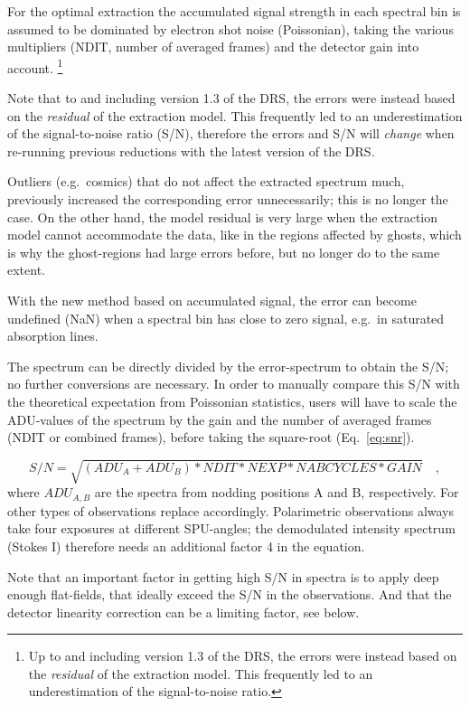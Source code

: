 For the optimal extraction
the accumulated signal strength in each spectral bin is assumed to be dominated
by electron shot noise (Poissonian), taking the various multipliers (NDIT,
number of averaged frames) and the detector gain into account.
\footnote{Up to and including version 1.3 of the DRS, the errors were instead
 based on the \emph{residual} of the extraction model. This frequently led to
 an underestimation of the signal-to-noise ratio.}

Note that to and including version 1.3 of the DRS, the errors were instead based
on the \emph{residual} of the extraction model. This frequently led to an
underestimation of the signal-to-noise ratio (S/N), therefore the errors and
S/N will \emph{change} when re-running previous reductions with the latest
version of the DRS.

Outliers (e.g.~cosmics) that do not affect the extracted spectrum much,
previously increased the corresponding error unnecessarily; this is no longer
the case. On the other hand, the model residual is very large when the
extraction model cannot accommodate the data, like in the regions affected by
ghosts, which is why the ghost-regions had large errors before, but no longer do
to the same extent.

With the new method based on
accumulated signal, the error can become undefined (NaN) when a spectral bin has
close to zero signal, e.g.~in saturated absorption lines.

The spectrum can be directly divided by the error-spectrum to obtain the
S/N; no further conversions are necessary. 
In order to manually compare this S/N with the theoretical expectation from
Poissonian statistics, users will have to scale the ADU-values of the spectrum
by the gain and the number of averaged frames (NDIT or combined frames), before
taking the square-root (Eq.~\ref{eq:snr}).

\begin{equation}
    \label{eq:snr}
    S/N = \sqrt{(ADU_A+ADU_B)*NDIT*NEXP*NABCYCLES*GAIN}\quad ,
\end{equation}
where $ADU_{A,B}$ are the spectra from nodding positions A and B, respectively.
For other types of observations replace accordingly. Polarimetric observations
always take four exposures at different SPU-angles; the demodulated intensity
spectrum (Stokes I) therefore needs an additional factor 4 in the equation.

Note that an important factor in getting high S/N in spectra is to apply deep
enough flat-fields, that ideally exceed the S/N in the observations. And that
the detector linearity correction can be a limiting factor, see below.

